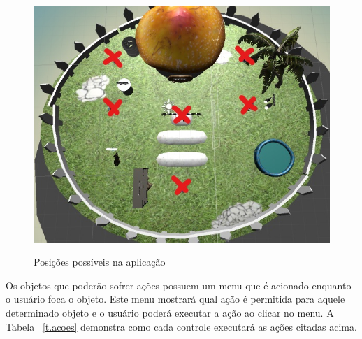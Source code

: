 \begin{figure}[H]
	\caption{\small Posições possíveis na aplicação}
	\centering
	\includegraphics[scale=0.50]{Imagens/posicoes.jpg}
	\label{f.posicoes}
\end{figure}

Os objetos que poderão sofrer ações possuem um menu que é acionado enquanto o usuário foca o objeto. Este menu mostrará qual ação é permitida para aquele determinado objeto e o usuário poderá executar a ação ao clicar no menu. A Tabela ~\ref{t.acoes} demonstra como cada controle executará as ações citadas acima. 

